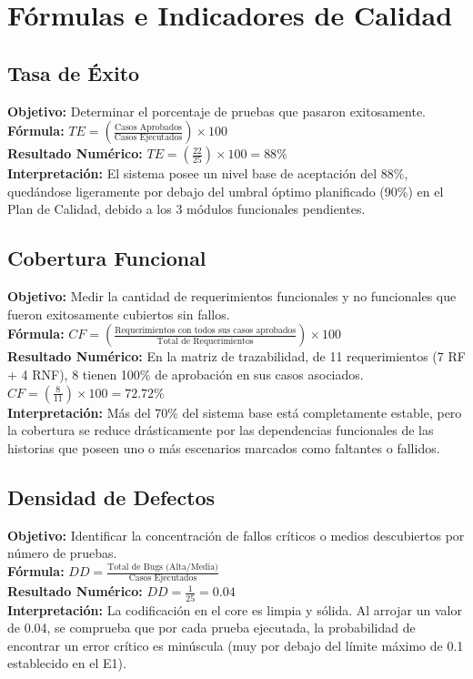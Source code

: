 \section{Fórmulas e Indicadores de Calidad}
\label{sec:formulas_indicadores}

\subsection{Tasa de Éxito}
\textbf{Objetivo:} Determinar el porcentaje de pruebas que pasaron exitosamente. \\
\textbf{Fórmula:} $TE = \left( \frac{\text{Casos Aprobados}}{\text{Casos Ejecutados}} \right) \times 100$ \\
\textbf{Resultado Numérico:} $TE = \left( \frac{22}{25} \right) \times 100 = 88\%$ \\
\textbf{Interpretación:} El sistema posee un nivel base de aceptación del 88\%, quedándose ligeramente por debajo del umbral óptimo planificado (90\%) en el Plan de Calidad, debido a los 3 módulos funcionales pendientes.

\subsection{Cobertura Funcional}
\textbf{Objetivo:} Medir la cantidad de requerimientos funcionales y no funcionales que fueron exitosamente cubiertos sin fallos. \\
\textbf{Fórmula:} $CF = \left( \frac{\text{Requerimientos con todos sus casos aprobados}}{\text{Total de Requerimientos}} \right) \times 100$ \\
\textbf{Resultado Numérico:} En la matriz de trazabilidad, de 11 requerimientos (7 RF + 4 RNF), 8 tienen 100\% de aprobación en sus casos asociados. $CF = \left( \frac{8}{11} \right) \times 100 = 72.72\%$ \\
\textbf{Interpretación:} Más del 70\% del sistema base está completamente estable, pero la cobertura se reduce drásticamente por las dependencias funcionales de las historias que poseen uno o más escenarios marcados como faltantes o fallidos.

\subsection{Densidad de Defectos}
\textbf{Objetivo:} Identificar la concentración de fallos críticos o medios descubiertos por número de pruebas. \\
\textbf{Fórmula:} $DD = \frac{\text{Total de Bugs (Alta/Media)}}{\text{Casos Ejecutados}}$ \\
\textbf{Resultado Numérico:} $DD = \frac{1}{25} = 0.04$ \\
\textbf{Interpretación:} La codificación en el core es limpia y sólida. Al arrojar un valor de 0.04, se comprueba que por cada prueba ejecutada, la probabilidad de encontrar un error crítico es minúscula (muy por debajo del límite máximo de 0.1 establecido en el E1).

